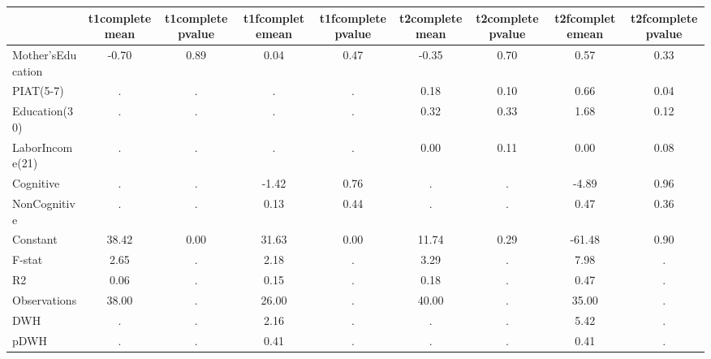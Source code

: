 \begin{table}[htbp]
\begin{tabular}{lcccccccc} \hline \hline
 & t1completemean  & t1completepvalue  & t1fcompletemean  & t1fcompletepvalue  & t2completemean  & t2completepvalue  & t2fcompletemean  & t2fcompletepvalue  \\  \hline 
Mother'sEducation &        -0.70 &         0.89 &         0.04 &         0.47 &        -0.35 &         0.70 &         0.57 &         0.33 \\  
PIAT(5-7) &            . &            . &            . &            . &         0.18 &         0.10 &         0.66 &         0.04 \\  
Education(30) &            . &            . &            . &            . &         0.32 &         0.33 &         1.68 &         0.12 \\  
LaborIncome(21) &            . &            . &            . &            . &         0.00 &         0.11 &         0.00 &         0.08 \\  
Cognitive &            . &            . &        -1.42 &         0.76 &            . &            . &        -4.89 &         0.96 \\  
NonCognitive &            . &            . &         0.13 &         0.44 &            . &            . &         0.47 &         0.36 \\  
Constant &        38.42 &         0.00 &        31.63 &         0.00 &        11.74 &         0.29 &       -61.48 &         0.90 \\  
F-stat &         2.65 &            . &         2.18 &            . &         3.29 &            . &         7.98 &            . \\  
R2 &         0.06 &            . &         0.15 &            . &         0.18 &            . &         0.47 &            . \\  
Observations &        38.00 &            . &        26.00 &            . &        40.00 &            . &        35.00 &            . \\  
DWH &            . &            . &         2.16 &            . &            . &            . &         5.42 &            . \\  
pDWH &            . &            . &         0.41 &            . &            . &            . &         0.41 &            . \\  
\hline \hline \end{tabular}
\end{table}
